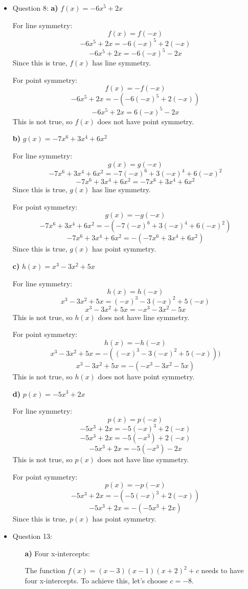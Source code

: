 \documentclass{article}
\begin{document}
\begin{itemize}
\newpage
\item Question 8:
\textbf{a) } $f(x) = -6x^5 + 2x$

For line symmetry:
\[
f(x) = f(-x)
\]
\[
-6x^5 + 2x = -6(-x)^5 + 2(-x)
\]
\[
-6x^5 + 2x = -6(-x)^5 - 2x
\]
Since this is true, $f(x)$ has line symmetry.

For point symmetry:
\[
f(x) = -f(-x)
\]
\[
-6x^5 + 2x = -(-6(-x)^5 + 2(-x))
\]
\[
-6x^5 + 2x = 6(-x)^5 - 2x
\]
This is not true, so $f(x)$ does not have point symmetry.

\textbf{b) } $g(x) = -7x^6 + 3x^4 + 6x^2$

For line symmetry:
\[
g(x) = g(-x)
\]
\[
-7x^6 + 3x^4 + 6x^2 = -7(-x)^6 + 3(-x)^4 + 6(-x)^2
\]
\[
-7x^6 + 3x^4 + 6x^2 = -7x^6 + 3x^4 + 6x^2
\]
Since this is true, $g(x)$ has line symmetry.

For point symmetry:
\[
g(x) = -g(-x)
\]
\[
-7x^6 + 3x^4 + 6x^2 = -(-7(-x)^6 + 3(-x)^4 + 6(-x)^2)
\]
\[
-7x^6 + 3x^4 + 6x^2 = -(-7x^6 + 3x^4 + 6x^2)
\]
Since this is true, $g(x)$ has point symmetry.

\textbf{c) } $h(x) = x^3 - 3x^2 + 5x$

For line symmetry:
\[
h(x) = h(-x)
\]
\[
x^3 - 3x^2 + 5x = (-x)^3 - 3(-x)^2 + 5(-x)
\]
\[
x^3 - 3x^2 + 5x = -x^3 - 3x^2 - 5x
\]
This is not true, so $h(x)$ does not have line symmetry.

For point symmetry:
\[
h(x) = -h(-x)
\]
\[
x^3 - 3x^2 + 5x = -((-x)^3 - 3(-x)^2 + 5(-x)))
\]
\[
x^3 - 3x^2 + 5x = -(-x^3 - 3x^2 - 5x)
\]
This is not true, so $h(x)$ does not have point symmetry.

\textbf{d) } $p(x) = -5x^3 + 2x$

For line symmetry:
\[
p(x) = p(-x)
\]
\[
-5x^3 + 2x = -5(-x)^3 + 2(-x)
\]
\[
-5x^3 + 2x = -5(-x^3) + 2(-x)
\]
\[
-5x^3 + 2x = -5(-x^3) - 2x
\]
This is not true, so $p(x)$ does not have line symmetry.

For point symmetry:
\[
p(x) = -p(-x)
\]
\[
-5x^3 + 2x = -(-5(-x)^3 + 2(-x))
\]
\[
-5x^3 + 2x = -(-5x^3 + 2x)
\]
Since this is true, $p(x)$ has point symmetry.

\item Question 13:
\begin{enumerate}
    \item[\textbf{a)}] Four x-intercepts:
    
    The function \(f(x) = (x - 3)(x - 1)(x + 2)^2 + c\) needs to have four x-intercepts. To achieve this, let's choose \(c = -8\).
    
    \begin{center}
    \end{center}
    

\end{enumerate}
\end{itemize}
\end{document}
